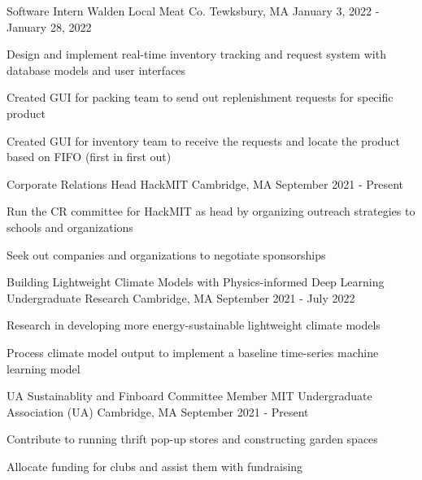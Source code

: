 \documentclass[12pt, letterpaper]{awesome-cv}
\begin{document}
\begin{cventries}
  \cventry
      {Software Intern} %
      {Walden Local Meat Co.} %
      {Tewksbury, MA} %
      {January 3, 2022 - January 28, 2022} %
      {
        \begin{cvitems} %
          \item {Design and implement real-time inventory tracking and request system with database models and user interfaces}
          \item {Created GUI for packing team to send out replenishment requests for specific product}
          \item {Created GUI for inventory team to receive the requests and locate the product based on FIFO (first in first out)}
      \end{cvitems}
    }

  \cventry
    {Corporate Relations Head} %
    {HackMIT} %
    {Cambridge, MA} %
    {September 2021 - Present} %
    {
      \begin{cvitems} %
        \item {Run the CR committee for HackMIT as head by organizing outreach strategies to schools and organizations}
        \item {Seek out companies and organizations to negotiate sponsorships}
      \end{cvitems}
    }

  \cventry
    {Building Lightweight Climate Models with Physics-informed Deep Learning } %
    {Undergraduate Research} %
    {Cambridge, MA} %
    {September 2021 - July 2022} %
    {
      \begin{cvitems} %
        \item {Research in developing more energy-sustainable lightweight climate models}
        \item {Process climate model output to implement a baseline time-series machine learning model}
      \end{cvitems}
    }


    \cventry
      {UA Sustainablity and Finboard Committee Member} %
      {MIT Undergraduate Association (UA)} %
      {Cambridge, MA} %
      {September 2021 - Present} %
      {
        \begin{cvitems} %
          \item {Contribute to running thrift pop-up stores and constructing garden spaces}
          \item {Allocate funding for clubs and assist them with fundraising}
      \end{cvitems}
    }


  \end{cventries} 
\end{document}
